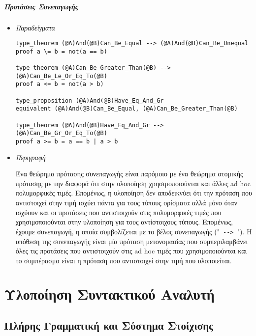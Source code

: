 \documentclass[diploma]{softlab-thesis}
\begin{document}
\newpage

\paragraph{Προτάσεις Συνεπαγωγής}

\begin{itemize}
\item \textit{Παραδείγματα}

\begin{verbatim}
type_theorem (@A)And(@B)Can_Be_Equal --> (@A)And(@B)Can_Be_Unequal
proof a \= b = not(a == b)

type_theorem (@A)Can_Be_Greater_Than(@B) --> (@A)Can_Be_Le_Or_Eq_To(@B)
proof a <= b = not(a > b)

type_proposition (@A)And(@B)Have_Eq_And_Gr
equivalent (@A)And(@B)Can_Be_Equal, (@A)Can_Be_Greater_Than(@B)

type_theorem (@A)And(@B)Have_Eq_And_Gr --> (@A)Can_Be_Gr_Or_Eq_To(@B)
proof a >= b = a == b | a > b
\end{verbatim}

\item \textit{Περιγραφή}

Ένα θεώρημα πρότασης συνεπαγωγής είναι παρόμοιο με ένα θεώρημα ατομικής
πρότασης με την διαφορά ότι στην υλοποίηση χρησιμοποιούνται και άλλες ad hoc
πολυμορφικές τιμές. Επομένως, η υλοποίηση δεν αποδεικνύει ότι την πρόταση
που αντιστοιχεί στην τιμή ισχύει πάντα για τους τύπους ορίσματα αλλά μόνο
όταν ισχύουν και οι προτάσεις που αντιστοιχούν στις πολυμορφικές τιμές
που χρησιμοποιούνται στην υλοποίηση για τους αντίστοιχους
τύπους. Επομένως, έχουμε συνεπαγωγή, η οποία συμβολίζεται με το βέλος
συνεπαγωγής ("\verb| --> |"). Η υπόθεση της συνεπαγωγής είναι μία πρόταση
μετονομασίας που συμπεριλαμβάνει όλες τις προτάσεις που αντιστοιχούν
στις ad hoc τιμές που χρησιμοποιούνται και το συμπέρασμα είναι η πρόταση
που αντιστοιχεί στην τιμή που υλοποιείται.

\end{itemize}

\chapter{Υλοποίηση Συντακτικού Αναλυτή}

\section{Πλήρης Γραμματική και Σύστημα Στοίχισης}
\label{sec:indsysgr}
\end{document}
